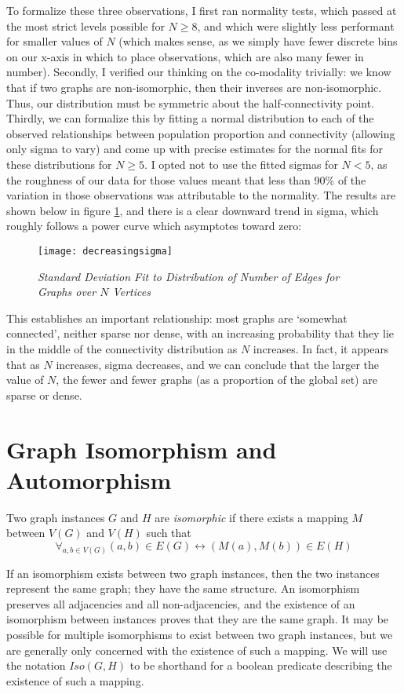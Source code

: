 To formalize these three observations, I first ran normality tests, which passed at the most strict levels possible for $N \geq 8$, and which were slightly less performant for smaller values of $N$ (which makes sense, as we simply have fewer discrete bins on our x-axis in which to place observations, which are also many fewer in number).
Secondly, I verified our thinking on the co-modality trivially: we know that if two graphs are non-isomorphic, then their inverses are non-isomorphic.
Thus, our distribution must be symmetric about the half-connectivity point.
Thirdly, we can formalize this by fitting a normal distribution to each of the observed relationships between population proportion and connectivity (allowing only sigma to vary) and come up with precise estimates for the normal fits for these distributions for $N \geq 5$.
I opted not to use the fitted sigmas for $N < 5$, as the roughness of our data for those values meant that less than 90\% of the variation in those observations was attributable to the normality.
The results are shown below in figure \ref{fig:decreasingsigma}, and there is a clear downward trend in sigma, which roughly follows a power curve which asymptotes toward zero:

\begin{figure}[h]
\caption{\emph{Standard Deviation Fit to Distribution of Number of Edges for Graphs over $N$ Vertices}}
\centering
\texttt{[image: decreasingsigma]}
\label{fig:decreasingsigma}
\end{figure}

This establishes an important relationship: most graphs are `somewhat connected', neither sparse nor dense, with an increasing probability that they lie in the middle of the connectivity distribution as $N$ increases.
In fact, it appears that as $N$ increases, sigma decreases, and we can conclude that the larger the value of $N$, the fewer and fewer graphs (as a proportion of the global set) are sparse or dense.

\section{Graph Isomorphism and Automorphism}

Two graph instances $G$ and $H$ are \emph{isomorphic} if there exists a mapping $M$ between $V(G)$ and $V(H)$ such that $$\forall_{a, b \in V(G)} (a, b) \in E(G) \leftrightarrow (M(a), M(b)) \in E(H)$$

If an isomorphism exists between two graph instances, then the two instances represent the same graph; they have the same structure.
An isomorphism preserves all adjacencies and all non-adjacencies, and the existence of an isomorphism between instances proves that they are the same graph.
It may be possible for multiple isomorphisms to exist between two graph instances, but we are generally only concerned with the existence of such a mapping.
We will use the notation $Iso(G, H)$ to be shorthand for a boolean predicate describing the existence of such a mapping.

